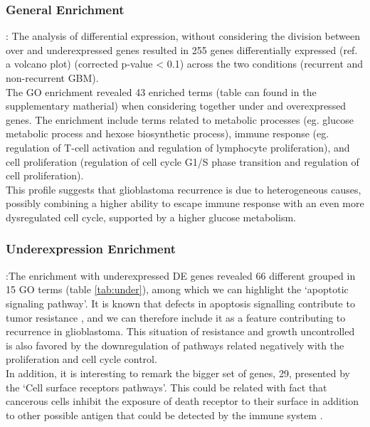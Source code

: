\documentclass[9pt,twocolumn,twoside]{gsajnl}
\begin{document}
\subsubsection*{General Enrichment}: The analysis of differential expression, without considering the division between over and underexpressed genes resulted in 255 genes differentially expressed (ref. a volcano plot) (corrected p-value < 0.1) across the two conditions (recurrent and non-recurrent GBM).\\
The GO enrichment revealed 43 enriched terms (table can found in the supplementary matherial) when considering together under and overexpressed genes. The enrichment include terms related to metabolic processes (eg. glucose metabolic process and hexose biosynthetic process), immune response (eg. regulation of T-cell activation and regulation of lymphocyte proliferation), and cell proliferation (regulation of cell cycle G1/S phase transition and regulation of cell proliferation).\\
This profile suggests that glioblastoma recurrence is due to heterogeneous causes, possibly combining a higher ability to escape immune response with an even more dysregulated cell cycle, supported by a higher glucose metabolism.

\subsubsection*{Underexpression Enrichment}:The enrichment with underexpressed DE genes revealed 66 different grouped in 15 GO terms (table \ref{tab:under}), among which we can highlight the `apoptotic signaling pathway'. It is known that defects in apoptosis signalling contribute to tumor resistance \citep{Debatin2004}, and we can therefore include it as a feature contributing to recurrence in glioblastoma. This situation of resistance and growth uncontrolled is also favored by the downregulation of pathways related negatively with the proliferation and cell cycle control.\\
In addition, it is interesting to remark the bigger set of genes, 29, presented by the `Cell surface receptors pathways'. This could be related with fact that cancerous cells inhibit the exposure of death receptor to their surface in addition to other possible antigen that could be detected by the immune system \citep{Ozoren2003}.
\end{document}
